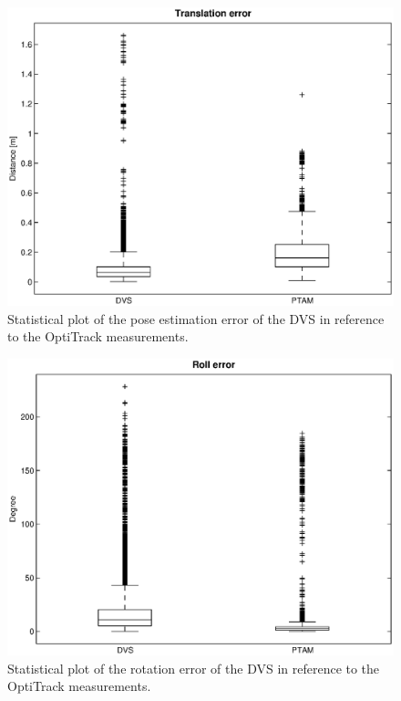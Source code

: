 \begin{figure}[h]
     \centering
     \includegraphics[width=1.0\textwidth]{img/trans_error_box.eps}
     \caption{Statistical plot of the pose estimation error of the DVS in reference to the OptiTrack measurements.}
     \label{img:trans_error_box}
\end{figure}

\begin{figure}[h]
     \centering
     \includegraphics[width=1.0\textwidth]{img/roll_error_box.eps}
     \caption{Statistical plot of the rotation error of the DVS in reference to the OptiTrack measurements.}
     \label{img:roll_error_box}
\end{figure}

